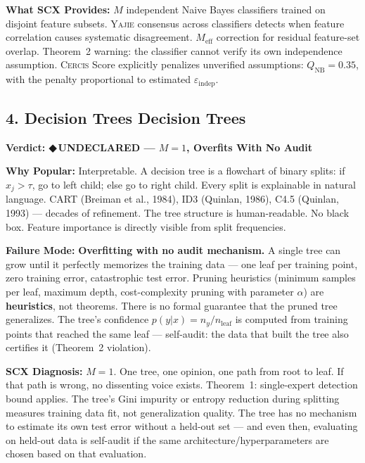 \documentclass[12pt,a4paper]{article}
\theoremstyle{definition}
\newcommand{\guilty}{{\color{guiltycolor}\textbf{◆\,UNDECLARED}}}
\newcommand{\Yajie}{\textsc{Yajie}}
\newcommand{\Cercis}{\textsc{Cercis}}
\newcommand{\auditHeader}[1]{\medskip\noindent\textbf{\large #1}\medskip}
\newcommand{\whyPopular}{\noindent\textbf{Why Popular:} }
\newcommand{\whyFail}{\noindent\textbf{Failure Mode:} }
\newcommand{\whatMissing}{\noindent\textbf{What SCX Provides:} }
\newcommand{\diagnosis}{\noindent\textbf{SCX Diagnosis:} }
\begin{document}
\whatMissing{} $M$ independent Naive Bayes classifiers trained on disjoint feature subsets. \Yajie{} consensus across classifiers detects when feature correlation causes systematic disagreement. $M_{\text{eff}}$ correction for residual feature-set overlap. Theorem~2 warning: the classifier cannot verify its own independence assumption. \Cercis{} Score explicitly penalizes unverified assumptions: $Q_{\text{NB}} = 0.35$, with the penalty proportional to estimated $\varepsilon_{\text{indep}}$.

\subsection{4. Decision Trees Decision Trees}

\auditHeader{Verdict: \guilty{} — $M=1$, Overfits With No Audit}

\whyPopular{} Interpretable. A decision tree is a flowchart of binary splits: if $x_j > \tau$, go to left child; else go to right child. Every split is explainable in natural language. CART (Breiman et al., 1984), ID3 (Quinlan, 1986), C4.5 (Quinlan, 1993) — decades of refinement. The tree structure is human-readable. No black box. Feature importance is directly visible from split frequencies.

\whyFail{} \textbf{Overfitting with no audit mechanism.} A single tree can grow until it perfectly memorizes the training data — one leaf per training point, zero training error, catastrophic test error. Pruning heuristics (minimum samples per leaf, maximum depth, cost-complexity pruning with parameter $\alpha$) are \textbf{heuristics}, not theorems. There is no formal guarantee that the pruned tree generalizes. The tree's confidence $p(y|x) = n_y / n_{\text{leaf}}$ is computed from training points that reached the same leaf — self-audit: the data that built the tree also certifies it (Theorem~2 violation).

\diagnosis{} $M=1$. One tree, one opinion, one path from root to leaf. If that path is wrong, no dissenting voice exists. Theorem~1: single-expert detection bound applies. The tree's Gini impurity or entropy reduction during splitting measures training data fit, not generalization quality. The tree has no mechanism to estimate its own test error without a held-out set — and even then, evaluating on held-out data is self-audit if the same architecture/hyperparameters are chosen based on that evaluation.
\end{document}
